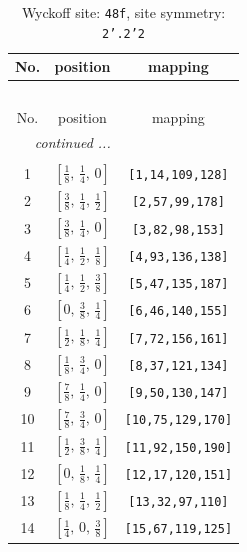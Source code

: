 \documentclass[fleqn,8pt]{jsarticle}
\begin{document}
\begin{longtable}{ccc}
\caption{Wyckoff site: {\tt 48f}, site symmetry: {\tt 2'.2'2}}
 \\
 \hline \hline
No. & position & mapping \\ \hline \endfirsthead

\multicolumn{2}{l}{\tablename\ \thetable{}} \\
 \hline \hline
No. & position & mapping \\ \hline \endhead

 \hline \hline
\multicolumn{2}{r}{\footnotesize\it continued ...} \\ \endfoot

 \hline \hline
\multicolumn{2}{r}{} \\ \endlastfoot

1 & $\left[ \frac{1}{8},\, \frac{1}{4},\, 0 \right]$ & {\tt [1,14,109,128]} \\ \hline
2 & $\left[ \frac{3}{8},\, \frac{1}{4},\, \frac{1}{2} \right]$ & {\tt [2,57,99,178]} \\ \hline
3 & $\left[ \frac{3}{8},\, \frac{1}{4},\, 0 \right]$ & {\tt [3,82,98,153]} \\ \hline
4 & $\left[ \frac{1}{4},\, \frac{1}{2},\, \frac{1}{8} \right]$ & {\tt [4,93,136,138]} \\ \hline
5 & $\left[ \frac{1}{4},\, \frac{1}{2},\, \frac{3}{8} \right]$ & {\tt [5,47,135,187]} \\ \hline
6 & $\left[ 0,\, \frac{3}{8},\, \frac{1}{4} \right]$ & {\tt [6,46,140,155]} \\ \hline
7 & $\left[ \frac{1}{2},\, \frac{1}{8},\, \frac{1}{4} \right]$ & {\tt [7,72,156,161]} \\ \hline
8 & $\left[ \frac{1}{8},\, \frac{3}{4},\, 0 \right]$ & {\tt [8,37,121,134]} \\ \hline
9 & $\left[ \frac{7}{8},\, \frac{1}{4},\, 0 \right]$ & {\tt [9,50,130,147]} \\ \hline
10 & $\left[ \frac{7}{8},\, \frac{3}{4},\, 0 \right]$ & {\tt [10,75,129,170]} \\ \hline
11 & $\left[ \frac{1}{2},\, \frac{3}{8},\, \frac{1}{4} \right]$ & {\tt [11,92,150,190]} \\ \hline
12 & $\left[ 0,\, \frac{1}{8},\, \frac{1}{4} \right]$ & {\tt [12,17,120,151]} \\ \hline
13 & $\left[ \frac{1}{8},\, \frac{1}{4},\, \frac{1}{2} \right]$ & {\tt [13,32,97,110]} \\ \hline
14 & $\left[ \frac{1}{4},\, 0,\, \frac{3}{8} \right]$ & {\tt [15,67,119,125]} \\ \hline

\end{longtable}
\end{document}
